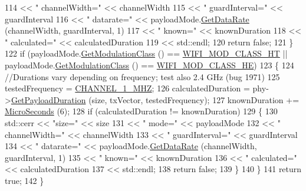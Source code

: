 \begin{DoxyCode}
114                 << \textcolor{stringliteral}{" channelWidth="} << channelWidth
115                 << \textcolor{stringliteral}{" guardInterval="} << guardInterval
116                 << \textcolor{stringliteral}{" datarate="} << payloadMode.\hyperlink{classns3_1_1WifiMode_adcfbe150f69da720db23387f733b8a52}{GetDataRate} (channelWidth, guardInterval, 1)
117                 << \textcolor{stringliteral}{" known="} << knownDuration
118                 << \textcolor{stringliteral}{" calculated="} << calculatedDuration
119                 << std::endl;
120       \textcolor{keywordflow}{return} \textcolor{keyword}{false};
121     \}
122   \textcolor{keywordflow}{if} (payloadMode.\hyperlink{classns3_1_1WifiMode_a7941cd2a0bc8d2ba68ba6a12c7e2c42a}{GetModulationClass} () == \hyperlink{namespacens3_aa999e1221606a2b21b1eb33c2007c217a6ac45cac36cc4454649435d24ebf349c}{WIFI\_MOD\_CLASS\_HT} || 
      payloadMode.\hyperlink{classns3_1_1WifiMode_a7941cd2a0bc8d2ba68ba6a12c7e2c42a}{GetModulationClass} () == \hyperlink{namespacens3_aa999e1221606a2b21b1eb33c2007c217abfa4f7272510045a9b43e8ac27ac13b0}{WIFI\_MOD\_CLASS\_HE})
123     \{
124       \textcolor{comment}{//Durations vary depending on frequency; test also 2.4 GHz (bug 1971)}
125       testedFrequency = \hyperlink{tx-duration-test_8cc_a236e95d73454722c31846ac6fcd3e497}{CHANNEL\_1\_MHZ};
126       calculatedDuration = phy->\hyperlink{classns3_1_1WifiPhy_a905bac41f7337da26788a2bbb971d3fa}{GetPayloadDuration} (size, txVector, testedFrequency);
127       knownDuration += \hyperlink{group__timecivil_ga17465a639c8d1464e76538afdd78a9f0}{MicroSeconds} (6);
128       \textcolor{keywordflow}{if} (calculatedDuration != knownDuration)
129         \{
130           std::cerr << \textcolor{stringliteral}{"size="} << size
131                     << \textcolor{stringliteral}{" mode="} << payloadMode
132                     << \textcolor{stringliteral}{" channelWidth="} << channelWidth
133                     << \textcolor{stringliteral}{" guardInterval="} << guardInterval
134                     << \textcolor{stringliteral}{" datarate="} << payloadMode.\hyperlink{classns3_1_1WifiMode_adcfbe150f69da720db23387f733b8a52}{GetDataRate} (channelWidth, guardInterval, 1)
135                     << \textcolor{stringliteral}{" known="} << knownDuration
136                     << \textcolor{stringliteral}{" calculated="} << calculatedDuration
137                     << std::endl;
138           \textcolor{keywordflow}{return} \textcolor{keyword}{false};
139         \}
140     \}
141   \textcolor{keywordflow}{return} \textcolor{keyword}{true};
142 \}
\end{DoxyCode}



